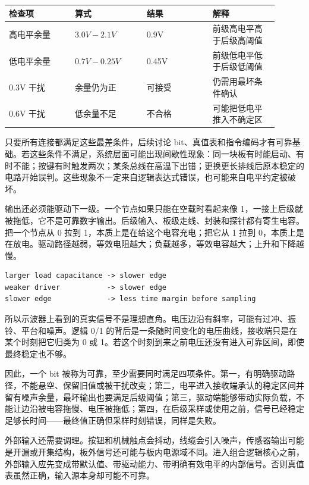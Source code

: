 \begin{longtable}{L{0.22\linewidth}L{0.24\linewidth}L{0.22\linewidth}L{0.22\linewidth}}
\toprule
检查项 & 算式 & 结果 & 解释 \\
\midrule
高电平余量 & $3.0V-2.1V$ & 0.9V & 前级高电平高于后级高阈值 \\
低电平余量 & $0.7V-0.25V$ & 0.45V & 前级低电平低于后级低阈值 \\
0.3V 干扰 & 余量仍为正 & 可接受 & 仍需用最坏条件确认 \\
0.6V 干扰 & 低余量不足 & 不合格 & 可能把低电平推入不确定区 \\
\bottomrule
\end{longtable}

只要所有连接都满足这些最差条件，后续讨论 bit、真值表和指令编码才有可靠基础。若这些条件不满足，系统层面可能出现间歇性现象：同一块板有时能启动、有时不能；按键有时触发两次；某条总线在高温下出错；更换更长排线后原本稳定的电路开始误判。这些现象不一定来自逻辑表达式错误，也可能来自电平约定被破坏。

输出还必须能驱动下一级。一个节点如果只能在空载时看起来像 1，一接上后级就被拖低，它不是可靠数字输出。后级输入、板级走线、封装和探针都有寄生电容。把一个节点从 0 拉到 1，本质上是在给这个电容充电；把它从 1 拉到 0，本质上是在放电。驱动路径越弱，等效电阻越大；负载越多，等效电容越大；上升和下降越慢。

\begin{lstlisting}
larger load capacitance -> slower edge
weaker driver           -> slower edge
slower edge             -> less time margin before sampling
\end{lstlisting}

所以示波器上看到的真实信号不是理想直角。电压边沿有斜率，可能有过冲、振铃、平台和噪声。逻辑 0/1 的背后是一条随时间变化的电压曲线，接收端只是在某个时刻把它归类为 0 或 1。若这个时刻到来之前电压还没有进入可靠区间，即使最终稳定也不够。

因此，一个 bit 被称为可靠，至少需要同时满足四项条件。第一，有明确驱动路径，不能悬空、保留旧值或被干扰改变；第二，电平进入接收端承认的稳定区间并留有噪声余量，最坏输出也要满足后级阈值；第三，驱动端能够带动实际负载，不能让边沿被电容拖慢、电压被拖低；第四，在后级采样或使用之前，信号已经稳定足够长时间——最终值正确但采样时刻错误，同样是失败。

外部输入还需要调理。按钮和机械触点会抖动，线缆会引入噪声，传感器输出可能是开漏或开集结构，板外信号还可能与板内电源域不同。进入组合逻辑核心之前，外部输入应先变成带默认值、带驱动能力、带明确有效电平的内部信号。否则真值表虽然正确，输入源本身却可能不可靠。

